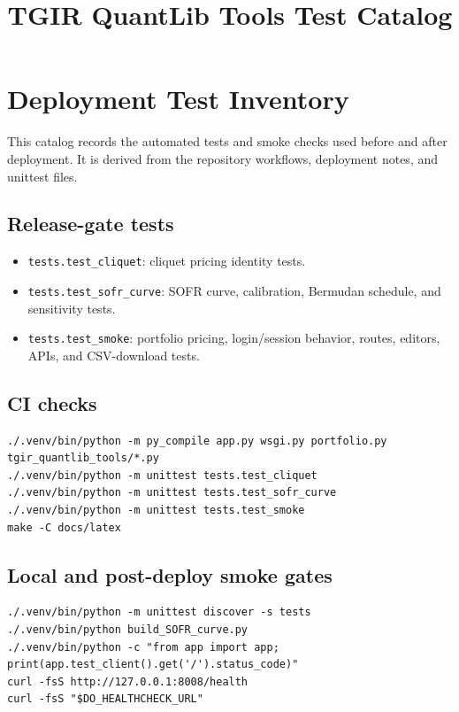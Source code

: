 \documentclass[conference]{IEEEtran}
\title{TGIR QuantLib Tools Test Catalog}
\author{\TGIRArticleAuthorBlock}
\begin{document}
\maketitle

\section{Deployment Test Inventory}
This catalog records the automated tests and smoke checks used before and after deployment. It is derived from the repository workflows, deployment notes, and unittest files.

\subsection{Release-gate tests}
\begin{itemize}
  \item \texttt{tests.test\_cliquet}: cliquet pricing identity tests.
  \item \texttt{tests.test\_sofr\_curve}: SOFR curve, calibration, Bermudan schedule, and sensitivity tests.
  \item \texttt{tests.test\_smoke}: portfolio pricing, login/session behavior, routes, editors, APIs, and CSV-download tests.
\end{itemize}

\subsection{CI checks}
\begin{lstlisting}
./.venv/bin/python -m py_compile app.py wsgi.py portfolio.py tgir_quantlib_tools/*.py
./.venv/bin/python -m unittest tests.test_cliquet
./.venv/bin/python -m unittest tests.test_sofr_curve
./.venv/bin/python -m unittest tests.test_smoke
make -C docs/latex
\end{lstlisting}

\subsection{Local and post-deploy smoke gates}
\begin{lstlisting}
./.venv/bin/python -m unittest discover -s tests
./.venv/bin/python build_SOFR_curve.py
./.venv/bin/python -c "from app import app; print(app.test_client().get('/').status_code)"
curl -fsS http://127.0.0.1:8008/health
curl -fsS "$DO_HEALTHCHECK_URL"
\end{lstlisting}
\end{document}
